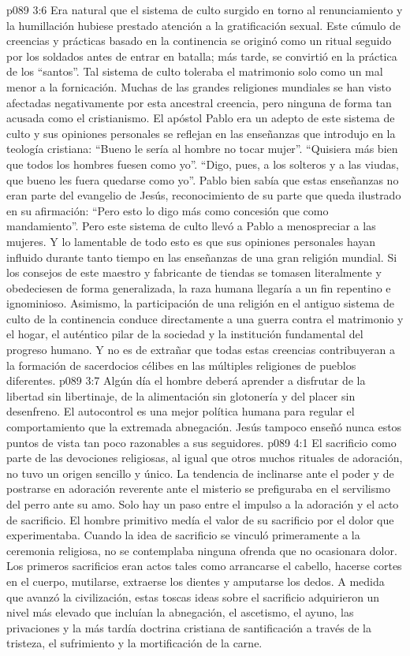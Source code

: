 \vs p089 3:6 \pc Era natural que el sistema de culto surgido en torno al renunciamiento y la humillación hubiese prestado atención a la gratificación sexual. Este cúmulo de creencias y prácticas basado en la continencia se originó como un ritual seguido por los soldados antes de entrar en batalla; más tarde, se convirtió en la práctica de los “santos”. Tal sistema de culto toleraba el matrimonio solo como un mal menor a la fornicación. Muchas de las grandes religiones mundiales se han visto afectadas negativamente por esta ancestral creencia, pero ninguna de forma tan acusada como el cristianismo. El apóstol Pablo era un adepto de este sistema de culto y sus opiniones personales se reflejan en las enseñanzas que introdujo en la teología cristiana: “Bueno le sería al hombre no tocar mujer”. “Quisiera más bien que todos los hombres fuesen como yo”. “Digo, pues, a los solteros y a las viudas, que bueno les fuera quedarse como yo”. Pablo bien sabía que estas enseñanzas no eran parte del evangelio de Jesús, reconocimiento de su parte que queda ilustrado en su afirmación: “Pero esto lo digo más como concesión que como mandamiento”. Pero este sistema de culto llevó a Pablo a menospreciar a las mujeres. Y lo lamentable de todo esto es que sus opiniones personales hayan influido durante tanto tiempo en las enseñanzas de una gran religión mundial. Si los consejos de este maestro y fabricante de tiendas se tomasen literalmente y obedeciesen de forma generalizada, la raza humana llegaría a un fin repentino e ignominioso. Asimismo, la participación de una religión en el antiguo sistema de culto de la continencia conduce directamente a una guerra contra el matrimonio y el hogar, el auténtico pilar de la sociedad y la institución fundamental del progreso humano. Y no es de extrañar que todas estas creencias contribuyeran a la formación de sacerdocios célibes en las múltiples religiones de pueblos diferentes.
\vs p089 3:7 \pc Algún día el hombre deberá aprender a disfrutar de la libertad sin libertinaje, de la alimentación sin glotonería y del placer sin desenfreno. El autocontrol es una mejor política humana para regular el comportamiento que la extremada abnegación. Jesús tampoco enseñó nunca estos puntos de vista tan poco razonables a sus seguidores.
\vs p089 4:1 El sacrificio como parte de las devociones religiosas, al igual que otros muchos rituales de adoración, no tuvo un origen sencillo y único. La tendencia de inclinarse ante el poder y de postrarse en adoración reverente ante el misterio se prefiguraba en el servilismo del perro ante su amo. Solo hay un paso entre el impulso a la adoración y el acto de sacrificio. El hombre primitivo medía el valor de su sacrificio por el dolor que experimentaba. Cuando la idea de sacrificio se vinculó primeramente a la ceremonia religiosa, no se contemplaba ninguna ofrenda que no ocasionara dolor. Los primeros sacrificios eran actos tales como arrancarse el cabello, hacerse cortes en el cuerpo, mutilarse, extraerse los dientes y amputarse los dedos. A medida que avanzó la civilización, estas toscas ideas sobre el sacrificio adquirieron un nivel más elevado que incluían la abnegación, el ascetismo, el ayuno, las privaciones y la más tardía doctrina cristiana de santificación a través de la tristeza, el sufrimiento y la mortificación de la carne.
